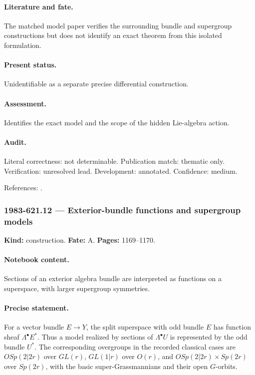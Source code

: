 \paragraph{Literature and fate.} The matched model paper verifies the surrounding bundle and supergroup constructions but does not identify an exact theorem from this isolated formulation.

\paragraph{Present status.} Unidentifiable as a separate precise differential construction.

\paragraph{Assessment.} Identifies the exact model and the scope of the hidden Lie-algebra action.

\paragraph{Audit.} Literal correctness: not determinable. Publication match: thematic only. Verification: unresolved lead. Development: annotated. Confidence: medium.

\noindent References: \citep{gelfandzelevinsky1984models}.\par

\subsubsection{1983-621.12 --- Exterior-bundle functions and supergroup models}

\label{item:1983-621.12}

\noindent\textbf{Kind:} construction. \textbf{Fate:} A. \textbf{Pages:} 1169--1170.\par

\paragraph{Notebook content.} Sections of an exterior algebra bundle are interpreted as functions on a superspace, with larger supergroup symmetries.

\paragraph{Precise statement.} For a vector bundle \(E\to Y\), the split superspace with odd bundle \(E\) has function sheaf \(\Lambda^\bullet E^*\). Thus a model realized by sections of \(\Lambda^\bullet U\) is represented by the odd bundle \(U^*\). The corresponding overgroups in the recorded classical cases are \(OSp(2|2r)\) over \(GL(r)\), \(GL(1|r)\) over \(O(r)\), and \(OSp(2|2r)\times Sp(2r)\) over \(Sp(2r)\), with the basic super-Grassmannians and their open \(G\)-orbits.

